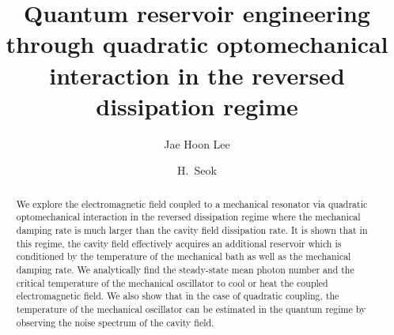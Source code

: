 \documentclass[pra,aps,showpacs,twocolumn,floatfix, superscriptaddress, nofootinbib, nobibnotes]{revtex4-1}
\begin{document}
\title{Quantum reservoir engineering through quadratic optomechanical interaction in the reversed dissipation regime}

\author{Jae Hoon Lee}
\author{H.~Seok}


\begin{abstract}
We explore the electromagnetic field coupled to a mechanical resonator via quadratic optomechanical interaction in the reversed dissipation regime where the mechanical damping rate is much larger than the cavity field dissipation rate. It is shown that in this regime, the cavity field effectively acquires an additional reservoir which is conditioned by the temperature of the mechanical bath as well as the mechanical damping rate. We analytically find the steady-state mean photon number and the critical temperature of the mechanical oscillator to cool or heat the coupled electromagnetic field. We also show that in the case of quadratic coupling, the temperature of the mechanical oscillator can be estimated in the quantum regime by observing the noise spectrum of the cavity field.
\end{abstract}


\maketitle
\end{document}
